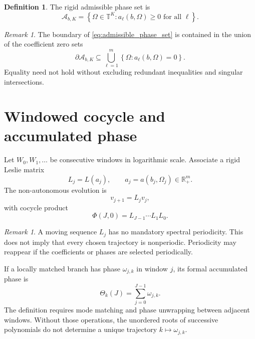 \documentclass[11pt]{amsart}
\numberwithin{equation}{section}
\theoremstyle{plain}
\theoremstyle{definition}
\newtheorem{definition}[theorem]{Definition}
\theoremstyle{remark}
\newtheorem{remark}[theorem]{Remark}
\begin{document}
\begin{definition}
\label{def:admissible_phase_set}
The rigid admissible phase set is
\begin{equation}
\mathcal A_{b,K}
=
\left\{
\Omega\in\mathbb T^K:
 a_\ell(b,\Omega)\geq0
 \text{ for all }\ell
\right\}.
\label{eq:admissible_phase_set}
\end{equation}
\end{definition}

\begin{remark}
\label{rem:boundary}
The boundary of \eqref{eq:admissible_phase_set} is contained in the union of the coefficient zero sets
\begin{equation}
\partial\mathcal A_{b,K}
\subseteq
\bigcup_{\ell=1}^{m}
\left\{\Omega:a_\ell(b,\Omega)=0\right\}.
\label{eq:admissible_boundary}
\end{equation}
Equality need not hold without excluding redundant inequalities and singular intersections.
\end{remark}

\section{Windowed cocycle and accumulated phase}
\label{sec:windowed_cocycle}

Let $W_0,W_1,\ldots$ be consecutive windows in logarithmic scale.  Associate a rigid Leslie matrix
\begin{equation}
L_j=L(a_j),
\qquad
a_j=a(b_j,\Omega_j)\in\mathbb R_+^m.
\label{eq:window_leslie}
\end{equation}
The non-autonomous evolution is
\begin{equation}
v_{j+1}=L_jv_j,
\label{eq:nonautonomous_evolution}
\end{equation}
with cocycle product
\begin{equation}
\Phi(J,0)=L_{J-1}\cdots L_1L_0.
\label{eq:cocycle_product}
\end{equation}

\begin{remark}
\label{rem:no_forced_periodicity}
A moving sequence $L_j$ has no mandatory spectral periodicity.  This does not imply that every chosen trajectory is nonperiodic.  Periodicity may reappear if the coefficients or phases are selected periodically.
\end{remark}

If a locally matched branch has phase $\omega_{j,k}$ in window $j$, its formal accumulated phase is
\begin{equation}
\Theta_k(J)=\sum_{j=0}^{J-1}\omega_{j,k}.
\label{eq:accumulated_phase}
\end{equation}
The definition requires mode matching and phase unwrapping between adjacent windows.  Without those operations, the unordered roots of successive polynomials do not determine a unique trajectory $k\mapsto\omega_{j,k}$.
\end{document}
